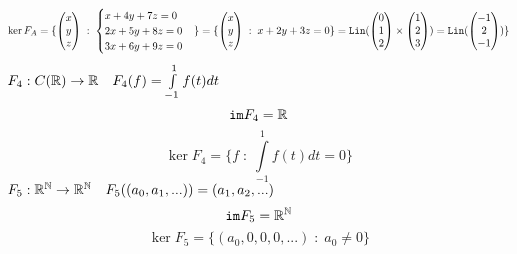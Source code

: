 \documentclass{article}
\begin{document}
$$\ker F_A=\{\begin{pmatrix}x\\y\\z\end{pmatrix}\;:\;\begin{cases}x+4y+7z=0\\2x+5y+8z=0\\3x+6y+9z=0\end{cases}\}\\=\{\begin{pmatrix}x\\y\\z\end{pmatrix}\;:\;x+2y+3z=0\}=\texttt{Lin}(\begin{pmatrix}0\\1\\2\end{pmatrix}\times\begin{pmatrix}1\\2\\3\end{pmatrix})=\texttt{Lin}(\begin{pmatrix}-1\\2\\-1\end{pmatrix})\}$$
$F_4:C(\mathbb{R})\to\mathbb{R}\quad F_4(f)=\int\limits_{-1}^1f(t)dt$
$$\texttt{im}F_4=\mathbb{R}$$
$$\ker F_4=\{f\;:\;\int\limits_{-1}^1f(t)dt=0\}$$
$F_5:\mathbb{R}^{\mathbb{N}}\to\mathbb{R}^{\mathbb{N}}\quad F_5((a_0, a_1, ...))=(a_1, a_2, ...)$
$$\texttt{im}F_5=\mathbb{R}^{\mathbb{N}}$$
$$\ker F_5=\{(a_0, 0, 0, 0, ...)\;:\;a_0\neq0\}$$
\end{document}
